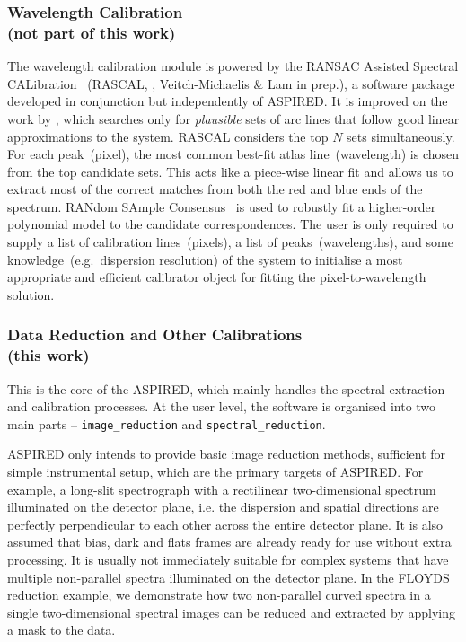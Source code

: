 \documentclass[twocolumn, linenumbers]{aastex631}
\begin{document}
\subsubsection*{Wavelength Calibration\\(not part of this work)}
The wavelength calibration module is powered by the RANSAC Assisted Spectral CALibration
~(\textsc{RASCAL}, \citealt{2020zndo...4117517V, 2020ASPC..527..627V}, Veitch-Michaelis
\& Lam in prep.), a software package developed in conjunction but independently of \textsc{ASPIRED}.
It is improved on the work by \citet{2018ApOpt..57.6876S}, which searches only for
\textit{plausible} sets of arc lines that follow good linear approximations to the
system. \textsc{RASCAL} considers the top $N$ sets simultaneously. For each peak~(pixel),
the most common best-fit atlas line~(wavelength) is chosen from the top candidate
sets. This acts like a piece-wise linear fit and allows us to extract most of
the correct matches from both the red and blue ends of the spectrum. RANdom
SAmple Consensus~\citep[RANSAC,][]{fischler_bolles_1981} is used to robustly
fit a higher-order polynomial model to the candidate correspondences. The user
is only required to supply a list of calibration lines~(pixels), a
list of peaks~(wavelengths), and some knowledge~(e.g.\ dispersion resolution) of
the system to initialise a most appropriate and efficient calibrator object for
fitting the pixel-to-wavelength solution.

\subsubsection*{Data Reduction and Other Calibrations\\(this work)}
This is the core of the \textsc{ASPIRED}, which mainly handles the spectral
extraction and calibration processes. At the user level, the software is
organised into two main parts -- \texttt{image\_reduction} and
\texttt{spectral\_reduction}.

\textsc{ASPIRED} only intends to provide basic image reduction methods,
sufficient for simple instrumental setup, which are the primary targets of
\textsc{ASPIRED}. For example, a long-slit spectrograph with a rectilinear
two-dimensional spectrum illuminated on the detector plane, i.e. the dispersion
and spatial directions are perfectly perpendicular to each other across the
entire detector plane. It is also assumed that bias, dark and flats frames
are already ready for use without extra processing. It is usually not
immediately suitable for complex systems that have multiple non-parallel
spectra illuminated on the detector plane. In the FLOYDS reduction example,
we demonstrate how two non-parallel curved spectra in a single two-dimensional
spectral images can be reduced and extracted by applying a mask to the data.
\end{document}
